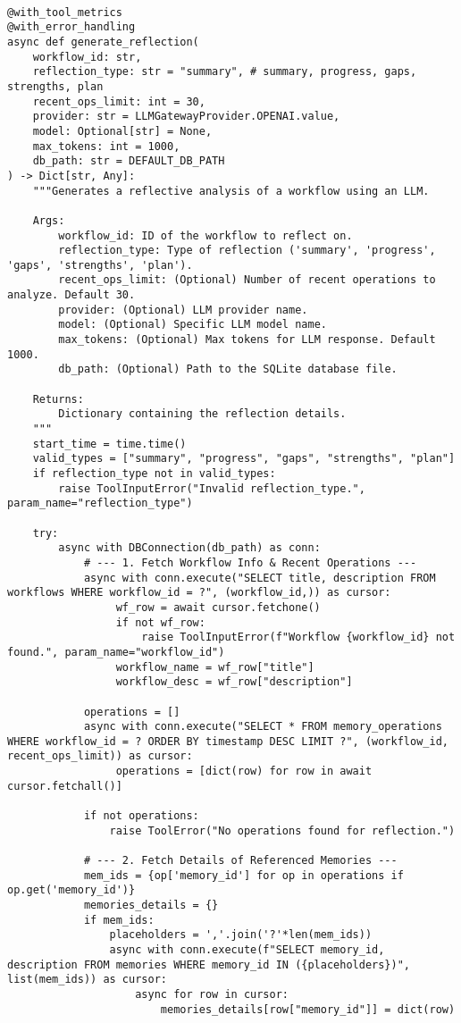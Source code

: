 \documentclass[12pt,a4paper]{article}
\begin{document}
\begin{pageablecode}
\begin{verbatim}
    
@with_tool_metrics
@with_error_handling
async def generate_reflection(
    workflow_id: str,
    reflection_type: str = "summary", # summary, progress, gaps, strengths, plan
    recent_ops_limit: int = 30,
    provider: str = LLMGatewayProvider.OPENAI.value,
    model: Optional[str] = None,
    max_tokens: int = 1000,
    db_path: str = DEFAULT_DB_PATH
) -> Dict[str, Any]:
    """Generates a reflective analysis of a workflow using an LLM.

    Args:
        workflow_id: ID of the workflow to reflect on.
        reflection_type: Type of reflection ('summary', 'progress', 'gaps', 'strengths', 'plan').
        recent_ops_limit: (Optional) Number of recent operations to analyze. Default 30.
        provider: (Optional) LLM provider name.
        model: (Optional) Specific LLM model name.
        max_tokens: (Optional) Max tokens for LLM response. Default 1000.
        db_path: (Optional) Path to the SQLite database file.

    Returns:
        Dictionary containing the reflection details.
    """
    start_time = time.time()
    valid_types = ["summary", "progress", "gaps", "strengths", "plan"]
    if reflection_type not in valid_types: 
        raise ToolInputError("Invalid reflection_type.", param_name="reflection_type")

    try:
        async with DBConnection(db_path) as conn:
            # --- 1. Fetch Workflow Info & Recent Operations ---
            async with conn.execute("SELECT title, description FROM workflows WHERE workflow_id = ?", (workflow_id,)) as cursor:
                 wf_row = await cursor.fetchone()
                 if not wf_row: 
                     raise ToolInputError(f"Workflow {workflow_id} not found.", param_name="workflow_id")
                 workflow_name = wf_row["title"]
                 workflow_desc = wf_row["description"]

            operations = []
            async with conn.execute("SELECT * FROM memory_operations WHERE workflow_id = ? ORDER BY timestamp DESC LIMIT ?", (workflow_id, recent_ops_limit)) as cursor:
                 operations = [dict(row) for row in await cursor.fetchall()]

            if not operations: 
                raise ToolError("No operations found for reflection.")

            # --- 2. Fetch Details of Referenced Memories ---
            mem_ids = {op['memory_id'] for op in operations if op.get('memory_id')}
            memories_details = {}
            if mem_ids:
                placeholders = ','.join('?'*len(mem_ids))
                async with conn.execute(f"SELECT memory_id, description FROM memories WHERE memory_id IN ({placeholders})", list(mem_ids)) as cursor:
                    async for row in cursor: 
                        memories_details[row["memory_id"]] = dict(row)


\end{verbatim}
\end{pageablecode}
\end{document}
